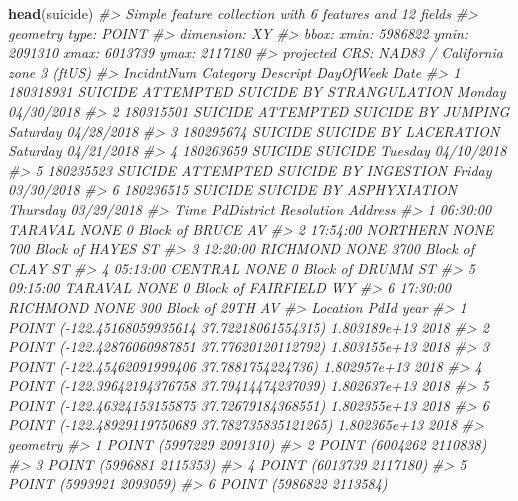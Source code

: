 \documentclass[
  12pt,
]{book}
\newenvironment{Shaded}{\begin{snugshade}}{\end{snugshade}}
\newcommand{\CommentTok}[1]{\textcolor[rgb]{0.37,0.37,0.37}{\textit{#1}}}
\newcommand{\KeywordTok}[1]{\textcolor[rgb]{0.27,0.27,0.27}{\textbf{#1}}}
\newcommand{\NormalTok}[1]{#1}
\begin{document}
\begin{Shaded}
\begin{Highlighting}[]
\KeywordTok{head}\NormalTok{(suicide)}
\CommentTok{\#\textgreater{} Simple feature collection with 6 features and 12 fields}
\CommentTok{\#\textgreater{} geometry type:  POINT}
\CommentTok{\#\textgreater{} dimension:      XY}
\CommentTok{\#\textgreater{} bbox:           xmin: 5986822 ymin: 2091310 xmax: 6013739 ymax: 2117180}
\CommentTok{\#\textgreater{} projected CRS:  NAD83 / California zone 3 (ftUS)}
\CommentTok{\#\textgreater{}   IncidntNum Category                           Descript DayOfWeek       Date}
\CommentTok{\#\textgreater{} 1  180318931  SUICIDE ATTEMPTED SUICIDE BY STRANGULATION    Monday 04/30/2018}
\CommentTok{\#\textgreater{} 2  180315501  SUICIDE       ATTEMPTED SUICIDE BY JUMPING  Saturday 04/28/2018}
\CommentTok{\#\textgreater{} 3  180295674  SUICIDE              SUICIDE BY LACERATION  Saturday 04/21/2018}
\CommentTok{\#\textgreater{} 4  180263659  SUICIDE                            SUICIDE   Tuesday 04/10/2018}
\CommentTok{\#\textgreater{} 5  180235523  SUICIDE     ATTEMPTED SUICIDE BY INGESTION    Friday 03/30/2018}
\CommentTok{\#\textgreater{} 6  180236515  SUICIDE            SUICIDE BY ASPHYXIATION  Thursday 03/29/2018}
\CommentTok{\#\textgreater{}       Time PdDistrict Resolution                 Address}
\CommentTok{\#\textgreater{} 1 06:30:00    TARAVAL       NONE     0 Block of BRUCE AV}
\CommentTok{\#\textgreater{} 2 17:54:00   NORTHERN       NONE   700 Block of HAYES ST}
\CommentTok{\#\textgreater{} 3 12:20:00   RICHMOND       NONE   3700 Block of CLAY ST}
\CommentTok{\#\textgreater{} 4 05:13:00    CENTRAL       NONE     0 Block of DRUMM ST}
\CommentTok{\#\textgreater{} 5 09:15:00    TARAVAL       NONE 0 Block of FAIRFIELD WY}
\CommentTok{\#\textgreater{} 6 17:30:00   RICHMOND       NONE    300 Block of 29TH AV}
\CommentTok{\#\textgreater{}                                         Location         PdId year}
\CommentTok{\#\textgreater{} 1  POINT ({-}122.45168059935614 37.72218061554315) 1.803189e+13 2018}
\CommentTok{\#\textgreater{} 2  POINT ({-}122.42876060987851 37.77620120112792) 1.803155e+13 2018}
\CommentTok{\#\textgreater{} 3   POINT ({-}122.45462091999406 37.7881754224736) 1.802957e+13 2018}
\CommentTok{\#\textgreater{} 4  POINT ({-}122.39642194376758 37.79414474237039) 1.802637e+13 2018}
\CommentTok{\#\textgreater{} 5  POINT ({-}122.46324153155875 37.72679184368551) 1.802355e+13 2018}
\CommentTok{\#\textgreater{} 6 POINT ({-}122.48929119750689 37.782735835121265) 1.802365e+13 2018}
\CommentTok{\#\textgreater{}                  geometry}
\CommentTok{\#\textgreater{} 1 POINT (5997229 2091310)}
\CommentTok{\#\textgreater{} 2 POINT (6004262 2110838)}
\CommentTok{\#\textgreater{} 3 POINT (5996881 2115353)}
\CommentTok{\#\textgreater{} 4 POINT (6013739 2117180)}
\CommentTok{\#\textgreater{} 5 POINT (5993921 2093059)}
\CommentTok{\#\textgreater{} 6 POINT (5986822 2113584)}
\end{Highlighting}
\end{Shaded}
\end{document}
